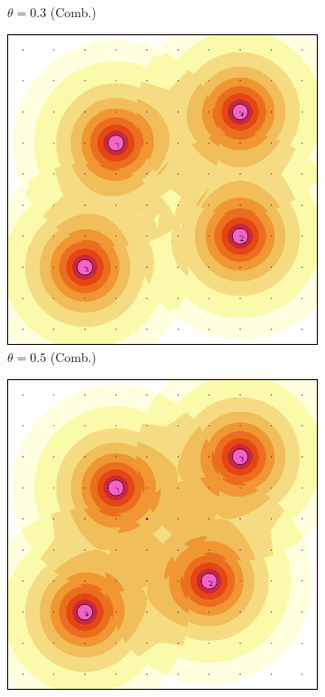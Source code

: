 \documentclass[letterpaper, 10 pt, conference]{ieeeconf}
\begin{document}
\begin{figure}[!h]
\begin{subfigure}[t]{0.4\columnwidth}
        \caption{$\theta = 0.3$ (Comb.)}
    \end{subfigure}%
    \hfill
    \begin{subfigure}[t]{0.4\columnwidth}
        \centering
        \includegraphics[width=\columnwidth]{Figures/DetFun_50.png}
        \caption{$\theta = 0.5$ (Comb.)}
    \end{subfigure}%
    \hfill
    \begin{subfigure}[t]{0.4\columnwidth}
        \centering
        \includegraphics[width=\columnwidth]{Figures/DetFun_70.png}

\end{subfigure}
\end{figure}
\end{document}

